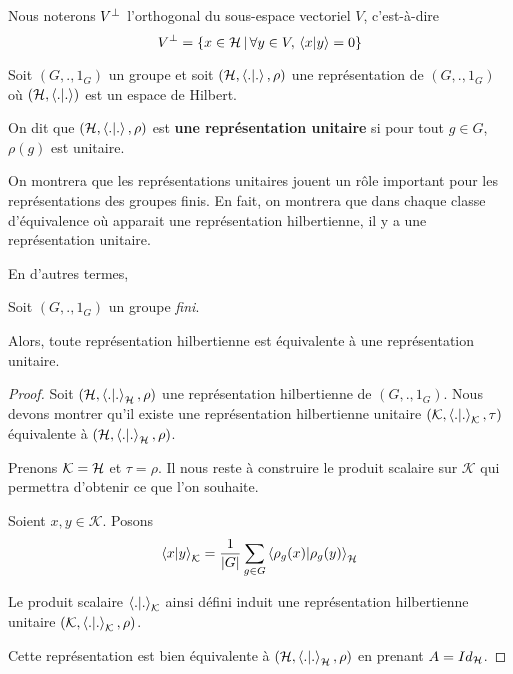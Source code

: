 
Nous noterons $V^{\perp}$ l'orthogonal du sous-espace vectoriel $V$, c'est-à-dire
\begin{equation}
	V^{\perp} = \left\{x \in \mathcal{H} \, | \, \forall y \in V, \, \bra{x}\ket{y} = 0 \right\}
\end{equation}

\begin{definition} 
	Soit $(G, ., 1_{G})$ un groupe et soit $(\mathcal{H}, \bra{.}\ket{.}, \rho)$ une représentation de
	$(G, ., 1_{G})$ où $(\mathcal{H}, \bra{.}\ket{.})$ est un espace de Hilbert.

	On dit que $(\mathcal{H}, \bra{.}\ket{.}, \rho)$ est \textbf{une représentation unitaire} si
	pour tout $g \in G$, $\rho(g)$ est unitaire.
\end{definition}

On montrera que les représentations unitaires jouent un rôle important pour les
représentations des groupes finis. En fait, on montrera que dans chaque classe
d'équivalence où apparait une représentation hilbertienne, il y a une
représentation unitaire.

En d'autres termes,

\begin{proposition}
	Soit $(G, ., 1_{G})$ un groupe \textit{fini}.

	Alors, toute représentation hilbertienne est équivalente à une
	représentation unitaire.
\end{proposition}

\ifdefined\outputproof
\begin{proof}
	Soit $(\mathcal{H}, \bra{.}\ket{.}_{\mathcal{H}}, \rho)$ une représentation hilbertienne de
	$(G, ., 1_{G})$.
	Nous devons montrer qu'il existe une représentation hilbertienne unitaire
	$(\mathcal{K}, \bra{.}\ket{.}_{\mathcal{K}}, \tau)$ équivalente à
	$(\mathcal{H}, \bra{.}\ket{.}_{\mathcal{H}}, \rho)$.

	Prenons $\mathcal{K} = \mathcal{H}$ et $\tau = \rho$. Il nous reste à
	construire le produit scalaire sur $\mathcal{K}$ qui permettra d'obtenir ce
	que l'on souhaite.

	Soient $x, y \in \mathcal{K}$. Posons
	\begin{equation}
		\bra{x}\ket{y}_{\mathcal{K}} = \frac{1}{|G|} \sum_{g \in G}
		\bra{\rho_{g}(x)}\ket{\rho_{g}(y)}_{\mathcal{H}}
	\end{equation}

	Le produit scalaire $\bra{.}\ket{.}_{\mathcal{K}}$ ainsi défini induit une
	représentation hilbertienne unitaire $(\mathcal{K},
	\bra{.}\ket{.}_{\mathcal{K}}, \rho)$.

	Cette représentation est bien équivalente à $(\mathcal{H},
	\bra{.}\ket{.}_{\mathcal{H}}, \rho)$ en prenant $A = Id_{\mathcal{H}}$.
\end{proof}
\fi

